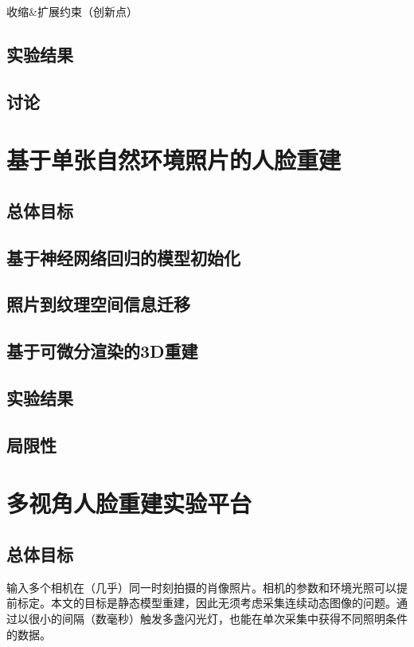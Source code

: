 \documentclass{scutmaster}
\begin{document}
收缩\&扩展约束（创新点）

\section{实验结果}

\section{讨论}

\chapter{基于单张自然环境照片的人脸重建}

\section{总体目标}

\section{基于神经网络回归的模型初始化}

\section{照片到纹理空间信息迁移}

\section{基于可微分渲染的3D重建}

\section{实验结果}

\section{局限性}

\chapter{多视角人脸重建实验平台}

\section{总体目标}

输入多个相机在（几乎）同一时刻拍摄的肖像照片。相机的参数和环境光照可以提前标定。本文的目标是静态模型重建，因此无须考虑采集连续动态图像的问题。通过以很小的间隔（数毫秒）触发多盏闪光灯，也能在单次采集中获得不同照明条件的数据。
\end{document}
